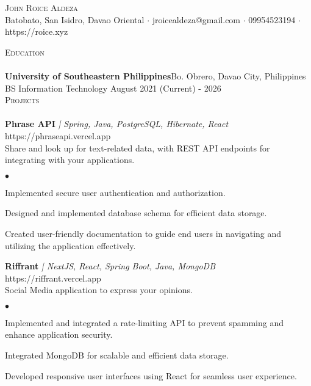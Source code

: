 \documentclass[a4paper]{article}
\newcommand{\lineunder} {
        \vspace*{-8pt} \\
        \hspace*{-18pt} \hrulefill \\
    }
\newcommand{\header} [1] {
        {\vspace*{4mm} \hspace*{-18pt}\vspace*{8pt} \textsc{#1}}
        \vspace*{-6pt} \lineunder
    }
\newenvironment{achievements}{
        \begin{list}
            {$\bullet$}{\topsep 0pt \itemsep -2pt}}{\vspace*{4pt}
        \end{list}
    }
\begin{document}
    \vspace*{-40pt}

    \vspace*{-10pt}
    \begin{center}
        {\Huge \scshape {John Roice Aldeza}}\\
        \vspace{2mm}
        Batobato, San Isidro, Davao Oriental $\cdot$ jroicealdeza@gmail.com $\cdot$ 09954523194 $\cdot$ https://roice.xyz\\
    \end{center}

    \header{Education}
    \textbf{University of Southeastern Philippines}\hfill Bo. Obrero, Davao City, Philippines\\
    BS Information Technology \hfill August 2021 (Current) - 2026\\


    \header{Projects}

    {\textbf{Phrase API}} {\sl | Spring, Java, PostgreSQL, Hibernate, React} \hfill https://phraseapi.vercel.app\\
    \vspace{1mm}
    Share and look up for text-related data, with REST API endpoints for integrating with your applications.\\
    \begin{achievements}
        \item Implemented secure user authentication and authorization.
        \item Designed and implemented database schema for efficient data storage.
        \item Created user-friendly documentation to guide end users in navigating and utilizing the application effectively.
    \end{achievements}
    \vspace*{3mm}

    {\textbf{Riffrant}} {\sl | NextJS, React, Spring Boot, Java, MongoDB} \hfill https://riffrant.vercel.app\\
    \vspace{1mm}
    Social Media application to express your opinions.\\
    \begin{achievements}
       \item Implemented and integrated a rate-limiting API to prevent spamming and enhance application security.
        \item Integrated MongoDB for scalable and efficient data storage.
        \item Developed responsive user interfaces using React for seamless user experience.
    \end{achievements}
    \vspace*{3mm}
\end{document}
